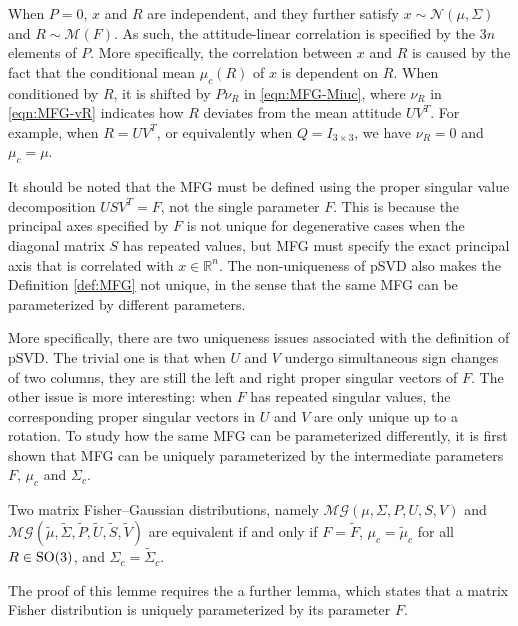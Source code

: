 When $P=0$, $x$ and $R$ are independent, and they further satisfy $x\sim\mathcal{N}(\mu,\Sigma)$ and $R\sim\mathcal{M}(F)$.
As such, the attitude-linear correlation is specified by the $3n$ elements of $P$.
More specifically, the correlation between $x$ and $R$ is caused by the fact that the conditional mean $\mu_c(R)$ of $x$ is dependent on $R$. 
When conditioned by $R$, it is shifted by $P\nu_R$ in \eqref{eqn:MFG-Miuc}, where $\nu_R$ in \eqref{eqn:MFG-vR} indicates how $R$ deviates from the mean attitude $UV^T$. 
For example, when $R=UV^T$, or equivalently when $Q=I_{3\times 3}$, we have $\nu_R=0$ and $\mu_c=\mu$.

It should be noted that the MFG must be defined using the proper singular value decomposition $USV^T = F$, not the single parameter $F$.
This is because the principal axes specified by $F$ is not unique for degenerative cases when the diagonal matrix $S$ has repeated values, but MFG must specify the exact principal axis that is correlated with $x\in\mathbb{R}^n$.
The non-uniqueness of pSVD also makes the Definition \ref{def:MFG} not unique, in the sense that the same MFG can be parameterized by different parameters.

More specifically, there are two uniqueness issues associated with the definition of pSVD.
The trivial one is that when $U$ and $V$ undergo simultaneous sign changes of two columns, they are still the left and right proper singular vectors of $F$.
The other issue is more interesting: when $F$ has repeated singular values, the corresponding proper singular vectors in $U$ and $V$ are only unique up to a rotation.
To study how the same MFG can be parameterized differently, it is first shown that MFG can be uniquely parameterized by the intermediate parameters $F$, $\mu_c$ and $\Sigma_c$.

\begin{lemma} \label{lemma:MFG-equivalent-intermediate}
	Two matrix Fisher--Gaussian distributions, namely $\mathcal{MG}(\mu,\allowbreak \Sigma,\allowbreak P,\allowbreak U,\allowbreak S,\allowbreak V)$ and $\mathcal{MG}(\tilde{\mu},\allowbreak \tilde{\Sigma},\allowbreak \tilde{P},\allowbreak \tilde{U},\allowbreak \tilde{S},\allowbreak \tilde{V})$ are equivalent if and only if $F=\tilde{F}$, $\mu_c = \tilde{\mu}_c$ for all $R\in\mathrm{SO}(3)$, and $\Sigma_c = \tilde{\Sigma}_c$.
\end{lemma}

The proof of this lemme requires the a further lemma, which states that a matrix Fisher distribution is uniquely parameterized by its parameter $F$.

